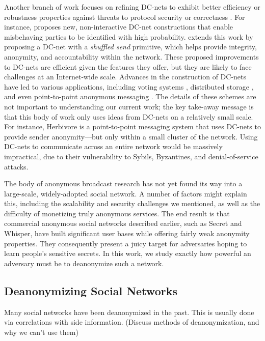 \documentclass[10pt, twocolumn]{article}
\begin{document}
Another branch of work focuses on refining DC-nets to exhibit better efficiency or robustness properties against threats to protocol security or correctness \cite{waidner1989dining,golle2004dining,corrigan2010dissent}.
For instance, \cite{golle2004dining} proposes new, non-interactive DC-net constructions that enable misbehaving parties to be identified with high probability.
\cite{corrigan2010dissent} extends this work by proposing a DC-net with a \emph{shuffled send} primitive, which helps provide integrity, anonymity, and accountability within the network.
These proposed improvements to DC-nets are efficient given the features they offer, but they are likely to face challenges at an Internet-wide scale.
Advances in the construction of DC-nets have led to various applications, including voting systems \cite{fujioka1993practical,van2010anonymous}, distributed storage \cite{freeHavenProject}, and even point-to-point anonymous messaging \cite{goel2003herbivore}.
The details of these schemes are not important to understanding our current work; the key take-away message is that this body of work only uses ideas from DC-nets on a relatively small scale.
For instance, Herbivore \cite{goel2003herbivore} is a point-to-point messaging system that uses DC-nets to provide sender anonymity---but only within a small cluster of the network.
Using DC-nets to communicate across an entire network would be massively impractical, due to their vulnerability to Sybils, Byzantines, and denial-of-service attacks.

The body of anonymous broadcast research has not yet found its way into a large-scale, widely-adopted social network. 
A number of factors might explain this, including the scalability and security challenges we mentioned, as well as the difficulty of monetizing truly anonymous services.
The end result is that commercial anonymous social networks described earlier, such as Secret and Whisper, have built significant user bases while offering fairly weak anonymity properties.
They consequently present a juicy target for adversaries hoping to learn people's sensitive secrets.
In this work, we study exactly how powerful an adversary must be to deanonymize such a network.

\subsection{Deanonymizing Social Networks}
Many social networks have been deanonymized in the past.
This is usually done via correlations with side information. (Discuss methods of deanonymization, and why we can't use them)
\end{document}
